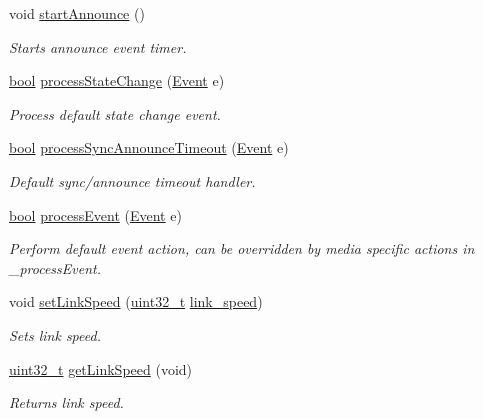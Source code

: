 \begin{DoxyCompactItemize}
void \hyperlink{class_common_port_a3119c85c0521ef3f23b4a2419684a015}{start\+Announce} ()
\begin{DoxyCompactList}\small\item\em Starts announce event timer. \end{DoxyCompactList}\item 
\hyperlink{avb__gptp_8h_af6a258d8f3ee5206d682d799316314b1}{bool} \hyperlink{class_common_port_a11047fcdc1e80ee322dba467a051698b}{process\+State\+Change} (\hyperlink{class_event}{Event} e)
\begin{DoxyCompactList}\small\item\em Process default state change event. \end{DoxyCompactList}\item 
\hyperlink{avb__gptp_8h_af6a258d8f3ee5206d682d799316314b1}{bool} \hyperlink{class_common_port_aebebd8986a920f60f1ecc1f8e5a027d0}{process\+Sync\+Announce\+Timeout} (\hyperlink{class_event}{Event} e)
\begin{DoxyCompactList}\small\item\em Default sync/announce timeout handler. \end{DoxyCompactList}\item 
\hyperlink{avb__gptp_8h_af6a258d8f3ee5206d682d799316314b1}{bool} \hyperlink{class_common_port_ac0536467e749cb4bb6b561f562857413}{process\+Event} (\hyperlink{class_event}{Event} e)
\begin{DoxyCompactList}\small\item\em Perform default event action, can be overridden by media specific actions in \+\_\+process\+Event. \end{DoxyCompactList}\item 
void \hyperlink{class_common_port_acecd1ce8f2db0d0160fa026ea30398e5}{set\+Link\+Speed} (\hyperlink{parse_8c_a6eb1e68cc391dd753bc8ce896dbb8315}{uint32\+\_\+t} \hyperlink{class_common_port_aae24fc4f200e75aa8215f797b2561dbf}{link\+\_\+speed})
\begin{DoxyCompactList}\small\item\em Sets link speed. \end{DoxyCompactList}\item 
\hyperlink{parse_8c_a6eb1e68cc391dd753bc8ce896dbb8315}{uint32\+\_\+t} \hyperlink{class_common_port_a78e0f246899dafdde4659c7ed0bb41d1}{get\+Link\+Speed} (void)
\begin{DoxyCompactList}\small\item\em Returns link speed. \end{DoxyCompactList}\item 

\end{DoxyCompactItemize}

